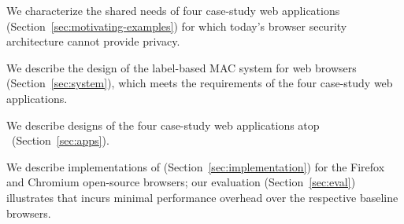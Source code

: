 \begin{CompactItemize}
\item We characterize the shared needs of four case-study web applications
  (Section~\ref{sec:motivating-examples}) for which today's browser
  security architecture cannot provide privacy.
\item We describe the design of the \sys{} label-based MAC system
  for web browsers (Section~\ref{sec:system}), which meets the
  requirements of the four case-study web applications.
\item We describe designs of the four case-study web applications atop
  \sys~(Section~\ref{sec:apps}).
\item We describe implementations of \sys{}
  (Section~\ref{sec:implementation}) for the Firefox and Chromium
  open-source browsers; our evaluation (Section~\ref{sec:eval})
  illustrates that \sys{} incurs minimal performance overhead over the
  respective baseline browsers.
\end{CompactItemize}

